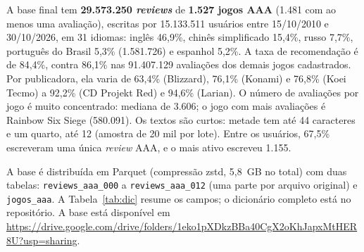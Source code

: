 \documentclass[12pt]{article}
\newcommand{\NUSU}{15.133.511}
\newcommand{\DTMIN}{15/10/2010}
\newcommand{\DTMAX}{30/10/2026}
\newcommand{\TAMGB}{5,8~GB}
\newcommand{\DESCTXT}{Os textos são curtos: metade tem até 44 caracteres e um quarto, até 12 (amostra de 20 mil por lote). Entre os usuários, 67,5\% escreveram uma única \textit{review} AAA, e o mais ativo escreveu 1.155.}
\newcommand{\LINKDRIVE}{\url{https://drive.google.com/drive/folders/1eko1pXDkzBBa40CgX2oKhJapxMtHER8U?usp=sharing}}
\begin{document}
A base final tem \textbf{29.573.250 \textit{reviews}} de \textbf{1.527 jogos AAA} (1.481 com ao
menos uma avaliação), escritas por \NUSU{} usuários entre \DTMIN{} e \DTMAX{}, em 31 idiomas:
inglês 46,9\%, chinês simplificado 15,4\%, russo 7,7\%, português do Brasil 5,3\% (1.581.726) e
espanhol 5,2\%. A taxa de recomendação é de 84,4\%, contra 86,1\% nas 91.407.129 avaliações dos
demais jogos cadastrados. Por publicadora, ela varia de 63,4\% (Blizzard), 76,1\% (Konami) e
76,8\% (Koei Tecmo) a 92,2\% (CD Projekt Red) e 94,6\% (Larian). O número de avaliações por jogo é
muito concentrado: mediana de 3.606; o jogo com mais avaliações é Rainbow Six Siege (580.091).
\DESCTXT

A base é distribuída em Parquet (compressão zstd, \TAMGB{} no total) com duas tabelas:
\texttt{reviews\_aaa\_000} a \texttt{reviews\_aaa\_012} (uma parte por arquivo original) e
\texttt{jogos\_aaa}. A Tabela~\ref{tab:dic} resume os campos; o dicionário completo está no
repositório. A base está disponível em \LINKDRIVE{}.
\end{document}
